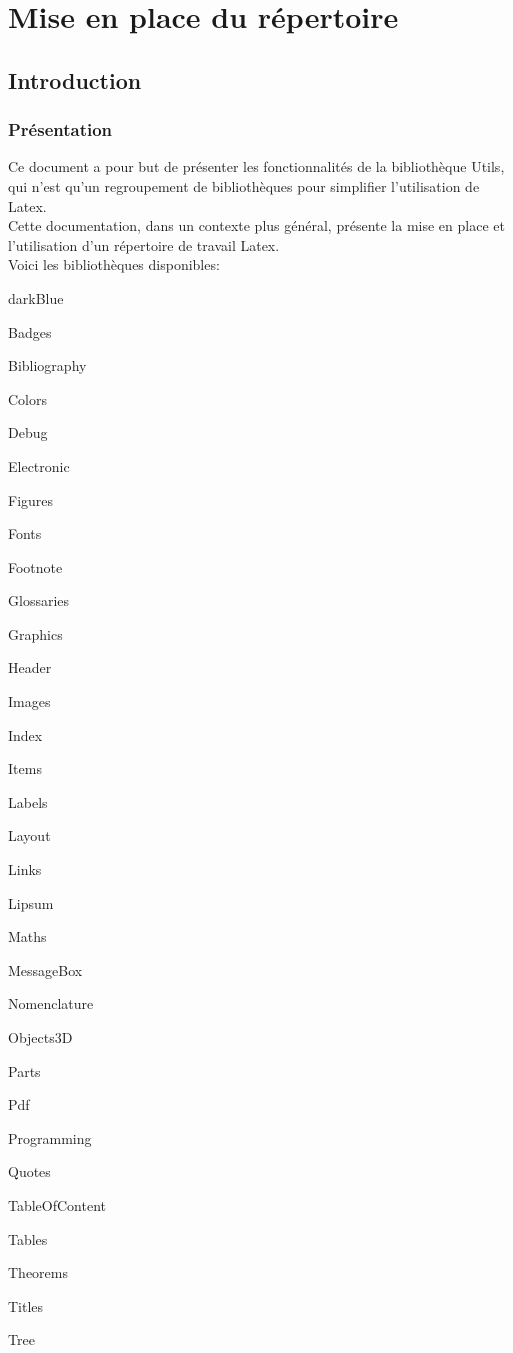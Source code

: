 \part{Mise en place du répertoire}

\chapter{Introduction}

\section{Présentation}
Ce document a pour but de présenter les fonctionnalités de la bibliothèque Utils, qui n'est qu'un 
regroupement de bibliothèques pour simplifier l'utilisation de Latex. \\

Cette documentation, dans un contexte plus général, présente la mise en place et l'utilisation d'un répertoire de travail Latex. \\
Voici les bibliothèques disponibles: 

\begin{items}{darkBlue}{\faviconLeaf}
\item Badges
\item Bibliography
\item Colors
\item Debug
\item Electronic
\item Figures
\item Fonts
\item Footnote
\item Glossaries
\item Graphics
\item Header
\item Images
\item Index
\item Items
\item Labels
\item Layout
\item Links
\item Lipsum
\item Maths
\item MessageBox
\item Nomenclature
\item Objects3D
\item Parts
\item Pdf
\item Programming
\item Quotes
\item TableOfContent
\item Tables
\item Theorems
\item Titles
\item Tree
\end{items}



